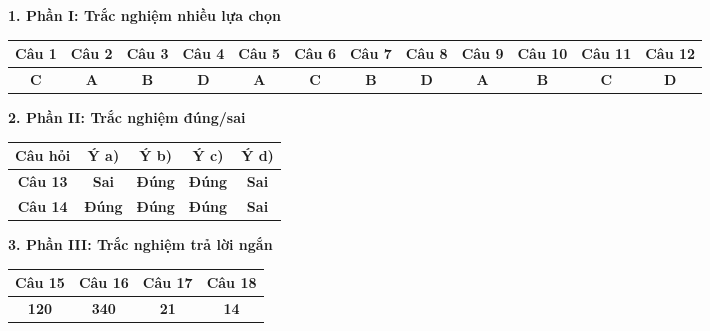 \documentclass[12pt,a4paper]{article}
\begin{document}
\vspace{0.2cm}
\textbf{1. Phần I: Trắc nghiệm nhiều lựa chọn}
\begin{center}
{\setlength{\tabcolsep}{2.5pt}\small
\begin{tabular}{|c|c|c|c|c|c|c|c|c|c|c|c|}
\hline
\textbf{Câu 1} & \textbf{Câu 2} & \textbf{Câu 3} & \textbf{Câu 4} & \textbf{Câu 5} & \textbf{Câu 6} & \textbf{Câu 7} & \textbf{Câu 8} & \textbf{Câu 9} & \textbf{Câu 10} & \textbf{Câu 11} & \textbf{Câu 12} \\
\hline
\textbf{C} & \textbf{A} & \textbf{B} & \textbf{D} & \textbf{A} & \textbf{C} & \textbf{B} & \textbf{D} & \textbf{A} & \textbf{B} & \textbf{C} & \textbf{D} \\
\hline
\end{tabular}}
\end{center}

\vspace{0.2cm}
\textbf{2. Phần II: Trắc nghiệm đúng/sai}
\begin{center}
\begin{tabular}{|c|c|c|c|c|}
\hline
\textbf{Câu hỏi} & \textbf{Ý a)} & \textbf{Ý b)} & \textbf{Ý c)} & \textbf{Ý d)} \\
\hline
\textbf{Câu 13} & \textbf{Sai} & \textbf{Đúng} & \textbf{Đúng} & \textbf{Sai} \\
\hline
\textbf{Câu 14} & \textbf{Đúng} & \textbf{Đúng} & \textbf{Đúng} & \textbf{Sai} \\
\hline
\end{tabular}
\end{center}

\vspace{0.2cm}
\textbf{3. Phần III: Trắc nghiệm trả lời ngắn}
\begin{center}
\begin{tabular}{|c|c|c|c|}
\hline
\textbf{Câu 15} & \textbf{Câu 16} & \textbf{Câu 17} & \textbf{Câu 18} \\
\hline
\textbf{120} & \textbf{340} & \textbf{21} & \textbf{14} \\
\hline
\end{tabular}
\end{center}
\end{document}
